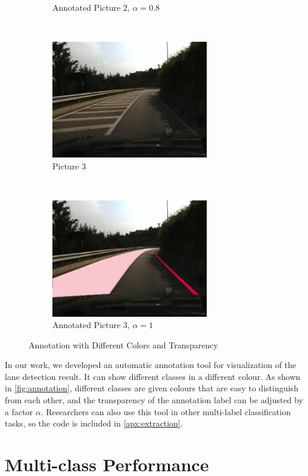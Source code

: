 \begin{spacing}{1.5}
\begin{figure}[!ht]
\begin{subfigure}[b]{0.49\textwidth}
        \caption{Annotated Picture 2, $\alpha=0.8$}
    \end{subfigure}
    \\
    \begin{subfigure}[b]{0.49\textwidth}
        \centering
        \includegraphics[width=2.7in, fbox]{Chapter5/Picture3.jpg}
        \caption{Picture 3}
    \end{subfigure}%
    ~
    \begin{subfigure}[b]{0.49\textwidth}
        \centering
        \includegraphics[width=2.7in, fbox]{Chapter5/Picture3an.jpg}
        \caption{Annotated Picture 3, $\alpha=1$}
    \end{subfigure}
    \caption{Annotation with Different Colors and Transparency}
    \label{fig:annotation}
\end{figure}


In our work, we developed an automatic annotation tool for visualization of the lane detection result. It can show different classes in a different colour. As shown in \autoref{fig:annotation}, different classes are given colours that are easy to distinguish from each other, and the transparency of the annotation label can be adjusted by a factor $\alpha$. Researchers can also use this tool in other multi-label classification tasks, so the code is included in \autoref{apx:extraction}.

\section{Multi-class Performance}
\label{sec:EX_multiclass}


\end{spacing}
